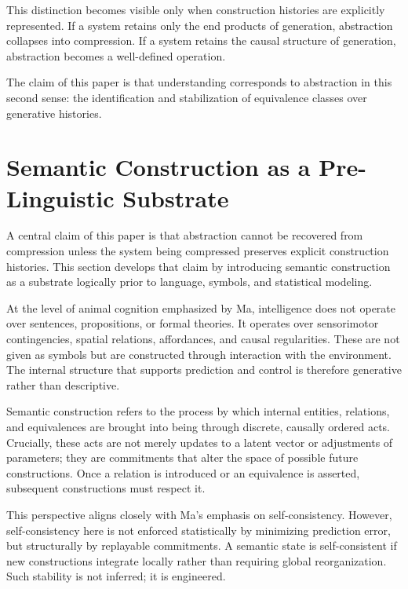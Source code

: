 \documentclass[11pt]{article}
\begin{document}
This distinction becomes visible only when construction histories are
explicitly represented. If a system retains only the end products of
generation, abstraction collapses into compression. If a system retains
the causal structure of generation, abstraction becomes a well-defined
operation.

The claim of this paper is that understanding corresponds to abstraction
in this second sense: the identification and stabilization of equivalence
classes over generative histories.

\section{Semantic Construction as a Pre-Linguistic Substrate}

A central claim of this paper is that abstraction cannot be recovered from
compression unless the system being compressed preserves explicit
construction histories. This section develops that claim by introducing
semantic construction as a substrate logically prior to language, symbols,
and statistical modeling.

At the level of animal cognition emphasized by Ma, intelligence does not
operate over sentences, propositions, or formal theories. It operates over
sensorimotor contingencies, spatial relations, affordances, and causal
regularities. These are not given as symbols but are constructed through
interaction with the environment. The internal structure that supports
prediction and control is therefore generative rather than descriptive.

Semantic construction refers to the process by which internal entities,
relations, and equivalences are brought into being through discrete,
causally ordered acts. Crucially, these acts are not merely updates to a
latent vector or adjustments of parameters; they are commitments that
alter the space of possible future constructions. Once a relation is
introduced or an equivalence is asserted, subsequent constructions must
respect it.

This perspective aligns closely with Ma’s emphasis on self-consistency.
However, self-consistency here is not enforced statistically by minimizing
prediction error, but structurally by replayable commitments. A semantic
state is self-consistent if new constructions integrate locally rather
than requiring global reorganization. Such stability is not inferred; it
is engineered.
\end{document}
